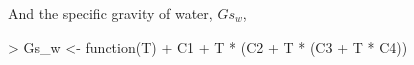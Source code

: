 And the specific gravity of water, $Gs_w$, 

\begin{Schunk}
\begin{Sinput}
> Gs_w <- function(T){
+ C1 + T * (C2 + T * (C3 + T * C4))}
\end{Sinput}
\end{Schunk}






